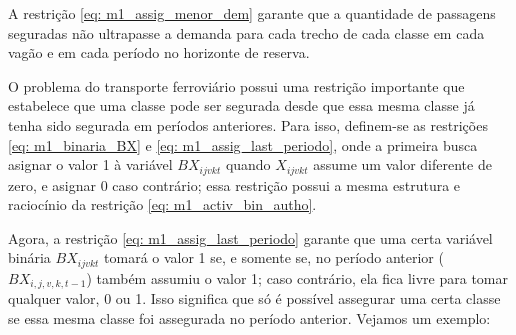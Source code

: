 A restrição \ref{eq: m1_assig_menor_dem} garante que a quantidade de passagens seguradas não ultrapasse a demanda para cada trecho de cada classe em cada vagão e em cada período no horizonte de reserva.

O problema do transporte ferroviário possui uma restrição importante que estabelece que uma classe pode ser segurada desde que essa mesma classe já tenha sido segurada em períodos anteriores. Para isso, definem-se as restrições \ref{eq: m1_binaria_BX} e \ref{eq: m1_assig_last_periodo}, onde a primeira busca asignar o valor 1 à variável $BX_{ijvkt}$ quando $X_{ijvkt}$ assume um valor diferente de zero, e asignar 0 caso contrário; essa restrição possui a mesma estrutura e raciocínio da restrição \ref{eq: m1_activ_bin_autho}.

Agora, a restrição \ref{eq: m1_assig_last_periodo} garante que uma certa variável binária $BX_{ijvkt}$ tomará o valor 1 se, e somente se, no período anterior ( $BX_{i,j,v,k,t-1}$) também assumiu o valor 1; caso contrário, ela fica livre para tomar qualquer valor, 0 ou 1. Isso significa que só é possível assegurar uma certa classe se essa mesma classe foi assegurada no período anterior. Vejamos um exemplo:


